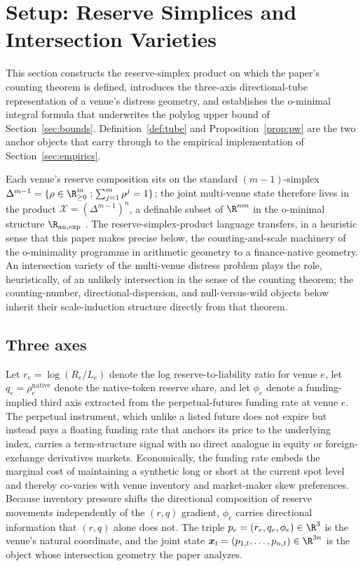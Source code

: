 \section{Setup: Reserve Simplices and Intersection Varieties}
\label{sec:setup}

This section constructs the reserve-simplex product on which the
paper's counting theorem is defined, introduces the three-axis
directional-tube representation of a venue's distress geometry, and
establishes the o-minimal integral formula that underwrites the
polylog upper bound of Section~\ref{sec:bounds}.
Definition~\ref{def:tube} and Proposition~\ref{prop:pw} are the two
anchor objects that carry through to the empirical implementation
of Section~\ref{sec:empirics}.

Each venue's reserve composition sits on the standard
$(m-1)$-simplex
$\Delta^{m-1} = \{\rho \in \R^m_{\ge 0} : \sum_{j=1}^{m}\rho^j = 1\}$;
the joint multi-venue state therefore lives in the product
$\mathcal{X} = (\Delta^{m-1})^n$, a definable subset of $\R^{nm}$
in the o-minimal structure $\R_{\mathrm{an},\exp}$
\citep{vandenDries1998Tame, PilaWilkie2006}. The
reserve-simplex-product language transfers, in a heuristic sense
that this paper makes precise below, the counting-and-scale
machinery of the o-minimality programme in arithmetic geometry
\citep{PilaWilkie2006, Pila2011ManinMumford,
BakkerKlinglerTsimerman2020} to a finance-native geometry. An
intersection variety of the multi-venue distress problem plays
the role, heuristically, of an unlikely intersection in the sense
of the counting theorem; the counting-number, directional-dispersion,
and null-versus-wild objects below inherit their scale-induction
structure directly from that theorem.

\subsection{Three axes}\label{sec:three-axes}

Let $r_e = \log(R_e / L_e)$ denote the log reserve-to-liability
ratio for venue $e$, let $q_e = \rho_e^{\mathrm{native}}$ denote the
native-token reserve share, and let $\phi_e$ denote a
funding-implied third axis extracted from the perpetual-futures
funding rate at venue $e$. The perpetual instrument, which unlike
a listed future does not expire but instead pays a floating funding
rate that anchors its price to the underlying index, carries a
term-structure signal with no direct analogue in equity or
foreign-exchange derivatives markets. Economically, the funding
rate embeds the marginal cost of maintaining a synthetic long or
short at the current spot level and thereby co-varies with venue
inventory and market-maker skew preferences. Because inventory
pressure shifts the directional composition of reserve movements
independently of the $(r,q)$ gradient, $\phi_e$ carries directional
information that $(r,q)$ alone does not. The triple
$p_e = (r_e, q_e, \phi_e) \in \R^3$ is the venue's natural
coordinate, and the joint state
$\boldsymbol{x}_t = (p_{1,t}, \dots, p_{n,t}) \in \R^{3n}$
is the object whose intersection geometry the paper analyzes.

